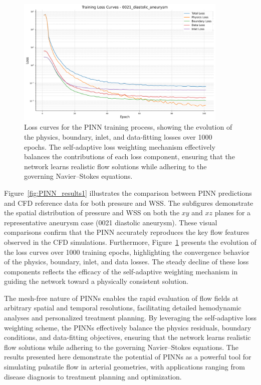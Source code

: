 \documentclass[12pt, a4paper]{article}
\begin{document}
\begin{figure}[H]
    \centering
    \scriptsize
    \includegraphics[width=0.9\textwidth]{0021_diastolic_aneurysm/0021_diastolic_aneurysm/loss_curves_0021_diastolic_aneurysm.png}
    \caption{Loss curves for the PINN training process, showing the evolution of the physics, boundary, inlet, and data-fitting losses over 1000 epochs. The self-adaptive loss weighting mechanism effectively balances the contributions of each loss component, ensuring that the network learns realistic flow solutions while adhering to the governing Navier--Stokes equations.}
    \label{fig:loss_curves1}
\end{figure}

Figure~\ref{fig:PINN_results1} illustrates the comparison between PINN predictions and CFD reference data for both pressure and WSS. The subfigures demonstrate the spatial distribution of pressure and WSS on both the \(xy\) and \(xz\) planes for a representative aneurysm case (0021 diastolic aneurysm). These visual comparisons confirm that the PINN accurately reproduces the key flow features observed in the CFD simulations. Furthermore, Figure~\ref{fig:loss_curves1} presents the evolution of the loss curves over 1000 training epochs, highlighting the convergence behavior of the physics, boundary, inlet, and data losses. The steady decline of these loss components reflects the efficacy of the self-adaptive weighting mechanism in guiding the network toward a physically consistent solution.

The mesh-free nature of PINNs \citep{raissi2019physics} enables the rapid evaluation of flow fields at arbitrary spatial and temporal resolutions, facilitating detailed hemodynamic analyses and personalized treatment planning. By leveraging the self-adaptive loss weighting scheme, the PINNs effectively balance the physics residuals, boundary conditions, and data-fitting objectives, ensuring that the network learns realistic flow solutions while adhering to the governing Navier--Stokes equations. The results presented here demonstrate the potential of PINNs as a powerful tool for simulating pulsatile flow in arterial geometries, with applications ranging from disease diagnosis to treatment planning and optimization.




\end{document}
